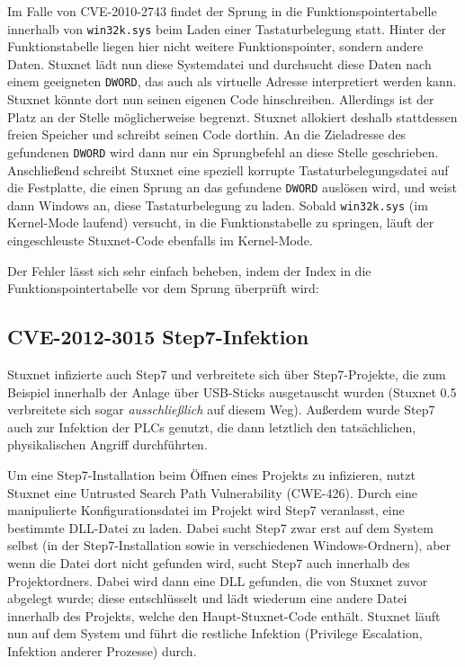 \documentclass[a4paper]{article}
\begin{document}
Im Falle von CVE-2010-2743 findet der Sprung in die Funktionspointertabelle innerhalb von \texttt{win32k.sys} beim Laden einer Tastaturbelegung statt.
Hinter der Funktionstabelle liegen hier nicht weitere Funktionspointer, sondern andere Daten.
Stuxnet lädt nun diese Systemdatei und durchsucht diese Daten nach einem geeigneten \texttt{DWORD}, das auch als virtuelle Adresse interpretiert werden kann.
Stuxnet könnte dort nun seinen eigenen Code hinschreiben. Allerdings ist der Platz an der Stelle möglicherweise begrenzt.
Stuxnet allokiert deshalb stattdessen freien Speicher und schreibt seinen Code dorthin.
An die Zieladresse des gefundenen \texttt{DWORD} wird dann nur ein Sprungbefehl an diese Stelle geschrieben.
Anschließend schreibt Stuxnet eine speziell korrupte Tastaturbelegungsdatei auf die Festplatte, die einen Sprung an das gefundene \texttt{DWORD} auslösen wird,
und weist dann Windows an, diese Tastaturbelegung zu laden.
Sobald \texttt{win32k.sys} (im Kernel-Mode laufend) versucht, in die Funktionstabelle zu springen,
läuft der eingeschleuste Stuxnet-Code ebenfalls im Kernel-Mode.

Der Fehler lässt sich sehr einfach beheben, indem der Index in die Funktionspointertabelle vor dem Sprung überprüft wird:



\subsection{CVE-2012-3015 Step7-Infektion}

Stuxnet infizierte auch Step7 und verbreitete sich über Step7-Projekte,
die zum Beispiel innerhalb der Anlage über USB-Sticks ausgetauscht wurden
(Stuxnet 0.5 verbreitete sich sogar \emph{ausschließlich} auf diesem Weg).
Außerdem wurde Step7 auch zur Infektion der PLCs genutzt, die dann letztlich den tatsächlichen, physikalischen Angriff durchführten.

Um eine Step7-Installation beim Öffnen eines Projekts zu infizieren, nutzt Stuxnet eine Untrusted Search Path Vulnerability (CWE-426\cite{cwe_searchpath}).
Durch eine manipulierte Konfigurationsdatei im Projekt wird Step7 veranlasst, eine bestimmte DLL-Datei zu laden.
Dabei sucht Step7 zwar erst auf dem System selbst (in der Step7-Installation sowie in verschiedenen Windows-Ordnern), %
aber wenn die Datei dort nicht gefunden wird, sucht Step7 auch innerhalb des Pro\-jekt\-ord\-ners.
Dabei wird dann eine DLL gefunden, die von Stuxnet zuvor abgelegt wurde;
diese entschlüsselt und lädt wiederum eine andere Datei innerhalb des Projekts, welche den Haupt-Stuxnet-Code enthält.
Stuxnet läuft nun auf dem System und führt die restliche Infektion (Privilege Escalation, Infektion anderer Prozesse) durch.
\end{document}

